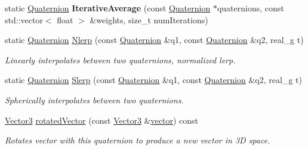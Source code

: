 \begin{DoxyCompactItemize}
\item 
\mbox{\label{classrev_1_1_quaternion_a93694b3a1f2d3fa45fff360b1c9fedb1}} 
static \mbox{\hyperlink{classrev_1_1_quaternion}{Quaternion}} {\bfseries Iterative\+Average} (const \mbox{\hyperlink{classrev_1_1_quaternion}{Quaternion}} $\ast$quaternions, const std\+::vector$<$ float $>$ \&weights, size\+\_\+t num\+Iterations)
\item 
static \mbox{\hyperlink{classrev_1_1_quaternion}{Quaternion}} \mbox{\hyperlink{classrev_1_1_quaternion_a4373b7eea8d53d6e19b942e5c8a0b366}{Nlerp}} (const \mbox{\hyperlink{classrev_1_1_quaternion}{Quaternion}} \&q1, const \mbox{\hyperlink{classrev_1_1_quaternion}{Quaternion}} \&q2, real\+\_\+g t)
\begin{DoxyCompactList}\small\item\em Linearly interpolates between two quaternions, normalized lerp. \end{DoxyCompactList}\item 
static \mbox{\hyperlink{classrev_1_1_quaternion}{Quaternion}} \mbox{\hyperlink{classrev_1_1_quaternion_acd605fb272c8b954eb5ec0982532a81c}{Slerp}} (const \mbox{\hyperlink{classrev_1_1_quaternion}{Quaternion}} \&q1, const \mbox{\hyperlink{classrev_1_1_quaternion}{Quaternion}} \&q2, real\+\_\+g t)
\begin{DoxyCompactList}\small\item\em Spherically interpolates between two quaternions. \end{DoxyCompactList}\item 
\mbox{\label{classrev_1_1_quaternion_afb84b87d32cc6ac27b1200ef9f685881}} 
\mbox{\hyperlink{classrev_1_1_vector}{Vector3}} \mbox{\hyperlink{classrev_1_1_quaternion_afb84b87d32cc6ac27b1200ef9f685881}{rotated\+Vector}} (const \mbox{\hyperlink{classrev_1_1_vector}{Vector3}} \&\mbox{\hyperlink{classrev_1_1_quaternion_a73919230823ebf8a8c8b9603a10c8dcc}{vector}}) const
\begin{DoxyCompactList}\small\item\em Rotates vector with this quaternion to produce a new vector in 3D space. \end{DoxyCompactList}\end{DoxyCompactItemize}
